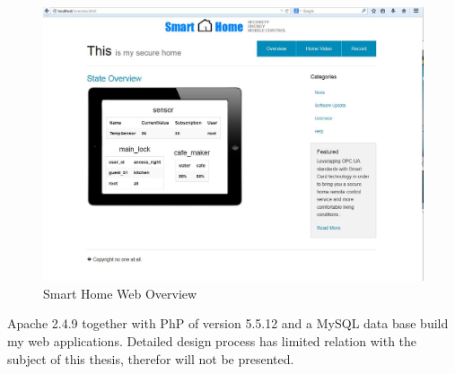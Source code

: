 \begin{figure}[!htb]
	\centering
	\includegraphics[width=1\textwidth]{Images/design/overview.jpg}
		\caption{Smart Home Web Overview}
	\label{fig:smart-home-frontpage}
\end{figure}
Apache 2.4.9 together with PhP of version 5.5.12 and a MySQL data base build my web applications.  Detailed design process has limited relation with the subject of this thesis, therefor will not be presented.